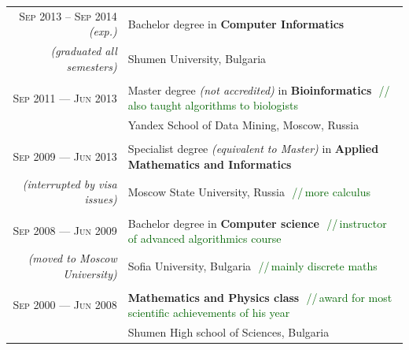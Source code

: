 \documentclass[a4paper,10pt]{article}
\def\myline{\color{linegray}\vline}
\newcommand{\minorcolor}[1]{\textcolor{mygray}{#1}}
\newcommand{\comment}[1]{\small\textcolor{darkgreen}{\,\,//\,#1}}
\newcommand{\mydate}[1]{\minorcolor{\textsc{#1}}}
\newcommand{\bracketcomment}[1]{{\small\textit{\minorcolor{(#1)}}}}
\begin{document}
\hspace{-2mm}\begin{tabular}{r!{\myline}p{14cm}}
  \mydate{Sep 2013 -- Sep 2014} \bracketcomment{exp.}     &  Bachelor degree in \textbf{Computer Informatics}\\
\bracketcomment{graduated all semesters}  &  Shumen University, Bulgaria\\

        \\
        \mydate{Sep 2011 --- Jun 2013}      &   Master degree \bracketcomment{not accredited} in \textbf{Bioinformatics}
                                                \comment{also taught algorithms to biologists}\\
	                                    &   Yandex School of Data Mining, Moscow, Russia\\
	
        \\
        \mydate{Sep 2009 --- Jun 2013}      &   Specialist degree \bracketcomment{equivalent to Master} in \textbf{Applied Mathematics and Informatics}\\
        \bracketcomment{interrupted by visa issues} & Moscow State University, Russia
                                                      \comment{more calculus}\\

	\\
        \mydate{Sep 2008 --- Jun 2009}      &   Bachelor degree in \textbf{Computer science}
                                                \comment{instructor of advanced algorithmics course}\\
        \bracketcomment{moved to Moscow University} &  Sofia University, Bulgaria \comment{mainly discrete maths}\\
	
	\\
        \mydate{Sep 2000 --- Jun 2008}      &   \textbf{Mathematics and Physics class}
                                                \comment{award for most scientific achievements of his year}\\
                                            &   Shumen High school of Sciences, Bulgaria\\
\end{tabular}
\par\smallskip
\end{document}
